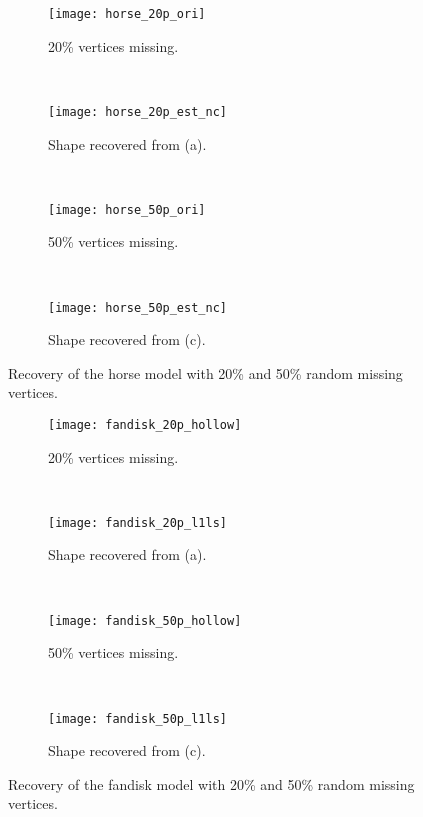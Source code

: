 \begin{figure}
  \centering
    \begin{subfigure}[b]{0.23\linewidth}
        \texttt{[image: horse\_20p\_ori]}
        \caption{20\% vertices missing.}
    \end{subfigure}
    ~
    \begin{subfigure}[b]{0.23\linewidth}
        \texttt{[image: horse\_20p\_est\_nc]}
        \caption{Shape recovered from (a).}
    \end{subfigure}
    ~
    \begin{subfigure}[b]{0.23\linewidth}
        \texttt{[image: horse\_50p\_ori]}
        \caption{50\% vertices missing.}
    \end{subfigure}
    ~
    \begin{subfigure}[b]{0.23\linewidth}
        \texttt{[image: horse\_50p\_est\_nc]}
        \caption{Shape recovered from (c).}
    \end{subfigure}
\caption{Recovery of the horse model with 20\% and 50\% random missing vertices.}
\label{fig:horse:recovery}
\end{figure}

\begin{figure}
  \centering
    \begin{subfigure}[b]{0.23\linewidth}
        \texttt{[image: fandisk\_20p\_hollow]}
        \caption{20\% vertices missing.}
    \end{subfigure}
    ~
    \begin{subfigure}[b]{0.23\linewidth}
        \texttt{[image: fandisk\_20p\_l1ls]}
        \caption{Shape recovered from (a).}
    \end{subfigure}
    ~
    \begin{subfigure}[b]{0.23\linewidth}
        \texttt{[image: fandisk\_50p\_hollow]}
        \caption{50\% vertices missing.}
    \end{subfigure}
    ~
    \begin{subfigure}[b]{0.23\linewidth}
        \texttt{[image: fandisk\_50p\_l1ls]}
        \caption{Shape recovered from (c).}
    \end{subfigure}
\caption{Recovery of the fandisk model with 20\% and 50\% random missing vertices.}
\label{fig:fandisk:recovery}
\end{figure}

